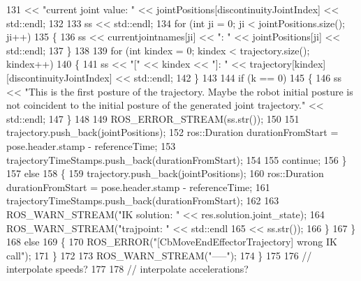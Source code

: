 \begin{DoxyCode}
131                        << \textcolor{stringliteral}{"current joint value: "} << jointPositions[discontinuityJointIndex] << std::endl;
132 
133                     ss << std::endl;
134                     \textcolor{keywordflow}{for} (\textcolor{keywordtype}{int} ji = 0; ji < jointPositions.size(); ji++)
135                     \{
136                         ss << currentjointnames[ji] << \textcolor{stringliteral}{": "} << jointPositions[ji] << std::endl;
137                     \}
138 
139                     \textcolor{keywordflow}{for} (\textcolor{keywordtype}{int} kindex = 0; kindex < trajectory.size(); kindex++)
140                     \{
141                         ss << \textcolor{stringliteral}{"["} << kindex << \textcolor{stringliteral}{"]: "} << trajectory[kindex][discontinuityJointIndex] << 
      std::endl;
142                     \}
143 
144                     \textcolor{keywordflow}{if} (k == 0)
145                     \{
146                         ss << \textcolor{stringliteral}{"This is the first posture of the trajectory. Maybe the robot initial posture
       is not coincident to the initial posture of the generated joint trajectory."} << std::endl;
147                     \}
148 
149                     ROS\_ERROR\_STREAM(ss.str());
150 
151                     trajectory.push\_back(jointPositions);
152                     ros::Duration durationFromStart = pose.header.stamp - referenceTime;
153                     trajectoryTimeStamps.push\_back(durationFromStart);
154 
155                     \textcolor{keywordflow}{continue};
156                 \}
157                 \textcolor{keywordflow}{else}
158                 \{
159                     trajectory.push\_back(jointPositions);
160                     ros::Duration durationFromStart = pose.header.stamp - referenceTime;
161                     trajectoryTimeStamps.push\_back(durationFromStart);
162 
163                     ROS\_WARN\_STREAM(\textcolor{stringliteral}{"IK solution: "} << res.solution.joint\_state);
164                     ROS\_WARN\_STREAM(\textcolor{stringliteral}{"trajpoint: "} << std::endl
165                                                   << ss.str());
166                 \}
167             \}
168             \textcolor{keywordflow}{else}
169             \{
170                 ROS\_ERROR(\textcolor{stringliteral}{"[CbMoveEndEffectorTrajectory] wrong IK call"});
171             \}
172 
173             ROS\_WARN\_STREAM(\textcolor{stringliteral}{"-----"});
174         \}
175 
176         \textcolor{comment}{// interpolate speeds?}
177 
178         \textcolor{comment}{// interpolate accelerations?}

\end{DoxyCode}
